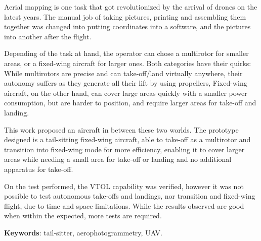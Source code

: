 \begin{resumo}[Abstract]

Aerial mapping is one task that got revolutionized by the arrival of drones on the latest years. The manual job of taking pictures, printing and assembling them together was changed into putting coordinates into a software, and the pictures into another after the flight.

Depending of the task at hand, the operator can chose a multirotor for smaller areas, or a fixed-wing aircraft for larger ones. Both categories have their quirks: While multirotors are precise and can take-off/land virtually anywhere, their autonomy suffers as they generate all their lift by using propellers, Fixed-wing aircraft, on the other hand, can cover large areas quickly with a smaller power consumption, but are harder to position, and require larger areas for take-off and landing.
 
This work proposed an aircraft in between these two worlds. The prototype designed is a tail-sitting fixed-wing aircraft, able to take-off as a multirotor and transition into fixed-wing mode for more efficiency, enabling it to cover larger areas while needing a small area for take-off or landing and no additional apparatus for take-off.	

On the test performed, the VTOL capability was verified, however it was not possible to test autonomous take-offs and landings, nor transition and fixed-wing flight, due to time and space limitations. While the results observed are good when within the expected, more tests are required. 

   \vspace{\onelineskip}
 
   \noindent 
   \textbf{Keywords}: tail-sitter, aerophotogrammetry, UAV.

\end{resumo}
